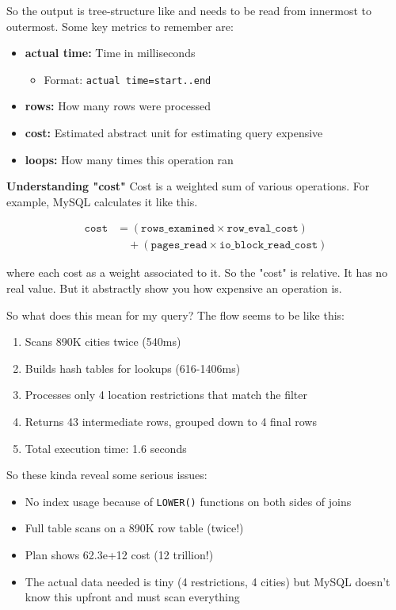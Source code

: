 So the output is tree-structure like and needs to be read from innermost to outermost. Some key metrics to remember are:
\begin{itemize}
    \item \textbf{actual time:} Time in milliseconds
    \begin{itemize}
        \item Format: \texttt{actual time=start..end}
    \end{itemize}
    \item \textbf{rows:} How many rows were processed
    \item \textbf{cost:} Estimated abstract unit for estimating query expensive
    \item \textbf{loops:} How many times this operation ran
\end{itemize}

\noindent\makebox[\linewidth]{\rule{\paperwidth}{0.4pt}}
\textbf{Understanding "cost"}
Cost is a weighted sum of various operations. For example, MySQL calculates it like this.

\begin{align*}
\texttt{cost} &= (\texttt{rows\_examined} \times \texttt{row\_eval\_cost}) \\
&\quad + (\texttt{pages\_read} \times \texttt{io\_block\_read\_cost})
\end{align*}

where each cost as a weight associated to it. So the "cost" is relative. It has no real value. But it abstractly show you how expensive an operation is.

\noindent\makebox[\linewidth]{\rule{\paperwidth}{0.4pt}}

So what does this mean for my query? The flow seems to be like this:
\begin{enumerate}
    \item Scans 890K cities twice (540ms)
    \item Builds hash tables for lookups (616-1406ms)
    \item Processes only 4 location restrictions that match the filter
    \item Returns 43 intermediate rows, grouped down to 4 final rows
    \item Total execution time: 1.6 seconds
\end{enumerate}


So these kinda reveal some serious issues:
\begin{itemize}
    \item No index usage because of \texttt{LOWER()} functions on both sides of joins
    \item Full table scans on a 890K row table (twice!)
    \item Plan shows 62.3e+12 cost (12 trillion!)
    \item The actual data needed is tiny (4 restrictions, 4 cities) but MySQL doesn't know this upfront and must scan everything
\end{itemize}

